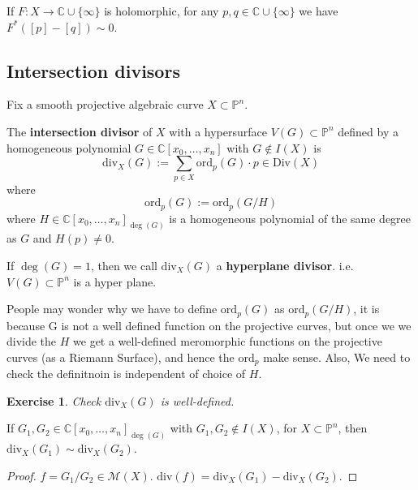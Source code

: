 \documentclass{article}
\newtheorem{exercise}{Exercise}
\begin{document}
\begin{example}
    If $F: X \to \mathbb{C} \cup \{\infty\}$ is holomorphic, for any $p, q \in \mathbb{C} \cup \{\infty\}$ we have $F^*([p] - [q]) \sim 0$.
\end{example}

\subsection{Intersection divisors}

Fix a smooth projective algebraic curve $X \subset \mathbb{P}^n$.

\begin{definition}
    The \textbf{intersection divisor} of $X$ with a hypersurface
    $V(G) \subset \mathbb{P}^n$ defined by a homogeneous polynomial $G \in \mathbb{C}[x_0, \dots, x_n]$
    with $G \notin I(X)$ is
    $$\text{div}_X(G) := \sum_{p \in X} \text{ord}_p(G) \cdot p \in \text{Div}(X)$$
    where
    $$\text{ord}_p(G) := \text{ord}_p(G/H)$$
    where $H \in \mathbb{C}[x_0, \dots, x_n]_{\deg(G)}$ is a homogeneous polynomial of the same degree as $G$ and $H(p) \neq 0$.

    If $\deg(G) = 1$, then we call $\text{div}_X(G)$ a \textbf{hyperplane divisor}.
    i.e. $V(G) \subset \mathbb{P}^n$ is a hyper plane.
\end{definition}

\begin{remark}
    People may wonder why we have to define $\text{ord}_p(G)$ as $\text{ord}_p(G/H)$, it is because G is not a well defined function on the projective curves, but once we we divide the $H$ we get a well-defined meromorphic functions on the projective curves (as a Riemann Surface), and hence the $\text{ord}_p$ make sense. Also, We need to check the definitnoin is independent of choice of $H$.
\end{remark}

\begin{exercise}
    Check $\text{div}_X(G)$ is well-defined.
\end{exercise}

\begin{lemma}
    If $G_1, G_2 \in \mathbb{C}[x_0, \dots, x_n]_{\deg(G)}$ with $G_1, G_2 \notin I(X)$,
    for $X \subset \mathbb{P}^n$, then $\text{div}_X(G_1) \sim \text{div}_X(G_2)$.
\end{lemma}
\begin{proof}
    $f = G_1/G_2 \in \mathcal{M}(X)$. $\text{div}(f) = \text{div}_X(G_1) - \text{div}_X(G_2)$.
\end{proof}
\end{document}
